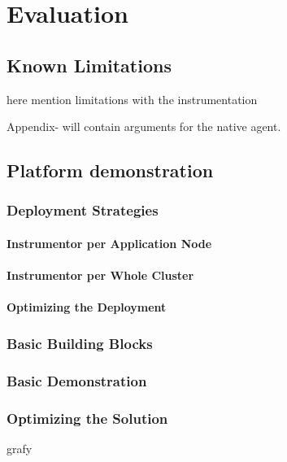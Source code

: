 \chapter{Evaluation}
\label{chap:evaluation}
\section{Known Limitations}
here mention limitations with the instrumentation


Appendix- will contain arguments for the native agent.
\section{Platform demonstration}
\subsection{Deployment Strategies}
\subsubsection{Instrumentor per Application Node}
\subsubsection{Instrumentor per Whole Cluster}
\subsubsection{Optimizing the Deployment}
\subsection{Basic Building Blocks}
\subsection{Basic Demonstration}
\subsection{Optimizing the Solution}

grafy